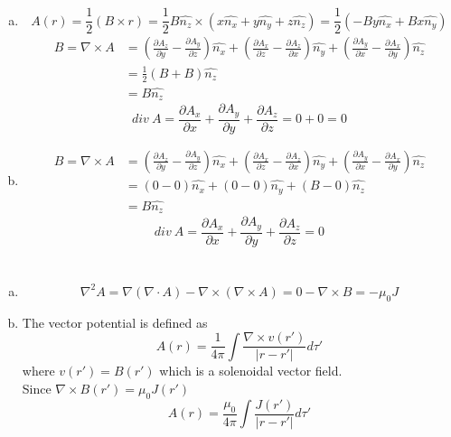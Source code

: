 \documentclass{article}
\begin{document}
\section{}
\begin{enumerate}[(a)]
\item
$$A(r)=\frac{1}{2}(B\times r)=\frac{1}{2}B\hat{n_z}\times(x\hat{n_x}+y\hat{n_y}+z\hat{n_z})=\frac{1}{2}(-By\hat{n_x}+Bx\hat{n_y})$$
\begin{align*}
B=\nabla\times A
&=\left(\frac{\partial A_z}{\partial y}-\frac{\partial A_y}{\partial z}\right)\hat{n_x}+\left(\frac{\partial A_x}{\partial z}-\frac{\partial A_z}{\partial x}\right)\hat{n_y}+\left(\frac{\partial A_y}{\partial x}-\frac{\partial A_x}{\partial y}\right)\hat{n_z}\\
&=\frac{1}{2}(B+B)\hat{n_z}\\
&=B\hat{n_z}
\end{align*}
$$div\ A=\frac{\partial A_x}{\partial x}+\frac{\partial A_y}{\partial y}+\frac{\partial A_z}{\partial z}=0+0=0$$
\item
\begin{align*}
B=\nabla\times A
&=\left(\frac{\partial A_z}{\partial y}-\frac{\partial A_y}{\partial z}\right)\hat{n_x}+\left(\frac{\partial A_x}{\partial z}-\frac{\partial A_z}{\partial x}\right)\hat{n_y}+\left(\frac{\partial A_y}{\partial x}-\frac{\partial A_x}{\partial y}\right)\hat{n_z}\\
&=(0-0)\hat{n_x}+(0-0)\hat{n_y}+(B-0)\hat{n_z}\\
&=B\hat{n_z}
\end{align*}
$$div\ A=\frac{\partial A_x}{\partial x}+\frac{\partial A_y}{\partial y}+\frac{\partial A_z}{\partial z}=0$$

\end{enumerate}

\section{}
\begin{enumerate}[(a)]
\item
$$\nabla^2A=\nabla(\nabla\cdot A)-\nabla\times(\nabla\times A)=0-\nabla\times B=-\mu_0J$$
\item
The vector potential is defined as
$$A(r)=\frac{1}{4\pi}\int\frac{\nabla\times v(r')}{|r-r'|}d\tau'$$
where $v(r')=B(r')$ which is a solenoidal vector field.\\
Since $\nabla\times B(r')=\mu_0J(r')$
$$A(r)=\frac{\mu_0}{4\pi}\int\frac{J(r')}{|r-r'|}d\tau'$$
\end{enumerate}
\end{document}
